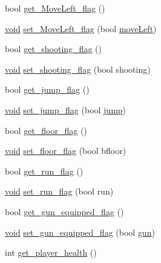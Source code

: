 \begin{DoxyCompactItemize}
\item 
bool \hyperlink{classPlayer__Actor_a852900313a1e3b3bd90bc0e91b35b5d5}{get\+\_\+\+Move\+Left\+\_\+flag} ()
\item 
\hyperlink{imgui__impl__opengl3__loader_8h_ac668e7cffd9e2e9cfee428b9b2f34fa7}{void} \hyperlink{classPlayer__Actor_ab31f55f4dd9643979ccaf15a939a1d9e}{set\+\_\+\+Move\+Left\+\_\+flag} (bool \hyperlink{classPlayer__Actor_a88fbeecef56bc4fffe695799b3ac2a7f}{move\+Left})
\item 
bool \hyperlink{classPlayer__Actor_a1a32125170fd21e572aef7402f29be88}{get\+\_\+shooting\+\_\+flag} ()
\item 
\hyperlink{imgui__impl__opengl3__loader_8h_ac668e7cffd9e2e9cfee428b9b2f34fa7}{void} \hyperlink{classPlayer__Actor_a7b35479be808a43b411afac6df0d8465}{set\+\_\+shooting\+\_\+flag} (bool shooting)
\item 
bool \hyperlink{classPlayer__Actor_a0ef98cdfdcd7d39e67bd0f6a075f31b6}{get\+\_\+jump\+\_\+flag} ()
\item 
\hyperlink{imgui__impl__opengl3__loader_8h_ac668e7cffd9e2e9cfee428b9b2f34fa7}{void} \hyperlink{classPlayer__Actor_a52135592f396bf6382b240f6365ce440}{set\+\_\+jump\+\_\+flag} (bool \hyperlink{classPlayer__Actor_a7e08ea67f40c62b7db50d96a74c54be8}{jump})
\item 
bool \hyperlink{classPlayer__Actor_a51b9108541326f084dc301272e48ff45}{get\+\_\+floor\+\_\+flag} ()
\item 
\hyperlink{imgui__impl__opengl3__loader_8h_ac668e7cffd9e2e9cfee428b9b2f34fa7}{void} \hyperlink{classPlayer__Actor_acc7db4ce6aea45fca15f9c0ac829656c}{set\+\_\+floor\+\_\+flag} (bool bfloor)
\item 
bool \hyperlink{classPlayer__Actor_a2534207ef014e56d33519cafad0cf46d}{get\+\_\+run\+\_\+flag} ()
\item 
\hyperlink{imgui__impl__opengl3__loader_8h_ac668e7cffd9e2e9cfee428b9b2f34fa7}{void} \hyperlink{classPlayer__Actor_a54802b3729837e379b0b86921058d16c}{set\+\_\+run\+\_\+flag} (bool run)
\item 
bool \hyperlink{classPlayer__Actor_a0648fa5e50079aaedbc2800cc3e9bfb7}{get\+\_\+gun\+\_\+equipped\+\_\+flag} ()
\item 
\hyperlink{imgui__impl__opengl3__loader_8h_ac668e7cffd9e2e9cfee428b9b2f34fa7}{void} \hyperlink{classPlayer__Actor_a026209b92ddb9579ed0cf9c648a3b6c1}{set\+\_\+gun\+\_\+equipped\+\_\+flag} (bool \hyperlink{game__play__state_8cpp_add80b8ad6081fe06bcfb1956a830b5fd}{gun})
\item 
int \hyperlink{classPlayer__Actor_a598906a781668a90b8cf7d8d8aea4b80}{get\+\_\+player\+\_\+health} ()

\end{DoxyCompactItemize}
